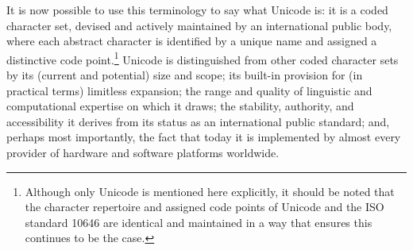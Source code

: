 It is now possible to use this terminology to say what Unicode is: it is a coded character set, devised and actively maintained by an international public body, where each abstract character is identified by a unique name and assigned a distinctive code point.\footnote{Although only Unicode is mentioned here explicitly, it should be noted that the character repertoire and assigned code points of Unicode and the ISO standard 10646 are identical and maintained in a way that ensures this continues to be the case.} Unicode is distinguished from other coded character sets by its (current and potential) size and scope; its built-in provision for (in practical terms) limitless expansion; the range and quality of linguistic and computational expertise on which it draws; the stability, authority, and accessibility it derives from its status as an international public standard; and, perhaps most importantly, the fact that today it is implemented by almost every provider of hardware and software platforms worldwide.
